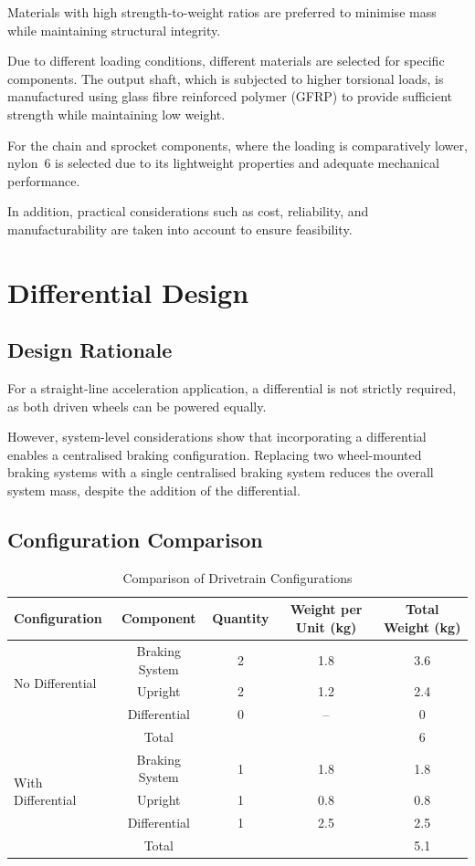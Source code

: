 \documentclass[11pt, a4paper]{report}
\numberwithin{equation}{section}
\begin{document}
Materials with high strength-to-weight ratios are preferred to minimise mass while maintaining structural integrity.

Due to different loading conditions, different materials are selected for specific components. The output shaft, which is subjected to higher torsional loads, is manufactured using glass fibre reinforced polymer (GFRP) to provide sufficient strength while maintaining low weight.

For the chain and sprocket components, where the loading is comparatively lower, nylon~6 is selected due to its lightweight properties and adequate mechanical performance.

In addition, practical considerations such as cost, reliability, and manufacturability are taken into account to ensure feasibility.

\section{Differential Design}

\subsection{Design Rationale}

For a straight-line acceleration application, a differential is not strictly required, as both driven wheels can be powered equally.

However, system-level considerations show that incorporating a differential enables a centralised braking configuration. Replacing two wheel-mounted braking systems with a single centralised braking system reduces the overall system mass, despite the addition of the differential.
\subsection{Configuration Comparison}

\begin{table}[H]
\centering
\caption{Comparison of Drivetrain Configurations}
\label{tab:drivetrain_comparison}
\begin{tabular}{lcccc}
\toprule
Configuration & Component & Quantity & Weight per Unit (kg) & Total Weight (kg) \\
\midrule
\multirow{3}{*}{No Differential} 
& Braking System & 2 & 1.8 & 3.6 \\
& Upright & 2 & 1.2 & 2.4 \\
& Differential & 0 & -- & 0 \\
& Total & & & 6 \\
\midrule
\multirow{3}{*}{With Differential} 
& Braking System & 1 & 1.8 & 1.8 \\
& Upright & 1 & 0.8 & 0.8 \\
& Differential & 1 & 2.5 & 2.5 \\
& Total & & & 5.1 \\
\bottomrule
\end{tabular}
\end{table}
\end{document}
